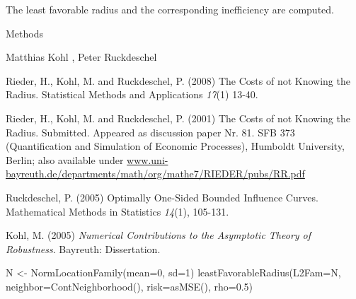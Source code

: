 \begin{Value}
The least favorable radius and the corresponding inefficiency 
are computed.
\end{Value}
\begin{Section}{Methods}
\end{Section}
\begin{Author}\relax
Matthias Kohl ,
Peter Ruckdeschel 
\end{Author}
\begin{References}\relax
Rieder, H., Kohl, M. and Ruckdeschel, P. (2008) The Costs of not Knowing
the Radius. Statistical Methods and Applications \emph{17}(1) 13-40.

Rieder, H., Kohl, M. and Ruckdeschel, P. (2001) The Costs of not Knowing
the Radius. Submitted. Appeared as discussion paper Nr. 81. 
SFB 373 (Quantification and Simulation of Economic Processes),
Humboldt University, Berlin; also available under
\url{www.uni-bayreuth.de/departments/math/org/mathe7/RIEDER/pubs/RR.pdf}

Ruckdeschel, P. (2005) Optimally One-Sided Bounded Influence Curves.
Mathematical Methods in Statistics \emph{14}(1), 105-131.

Kohl, M. (2005) \emph{Numerical Contributions to the Asymptotic Theory of Robustness}. 
Bayreuth: Dissertation.
\end{References}
\begin{SeeAlso}\relax
{}
\end{SeeAlso}
\begin{Examples}
\begin{ExampleCode}
N <- NormLocationFamily(mean=0, sd=1) 
leastFavorableRadius(L2Fam=N, neighbor=ContNeighborhood(),
                     risk=asMSE(), rho=0.5)
\end{ExampleCode}
\end{Examples}


